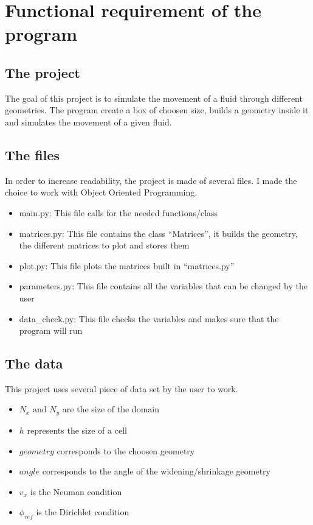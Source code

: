 \section{Functional requirement of the program}
\subsection{The project}
The goal of this project is to simulate the movement of a fluid through
different geometries. The program create a box of choosen size, builds a
geometry inside it and simulates the movement of a given fluid.
\subsection{The files}
In order to increase readability, the project is made of several files.
I made the choice to work with Object Oriented Programming.
\begin{itemize}
    \item main.py: This file calls for the needed functions/class
    \item matrices.py: This file contains the class ``Matrices'', it builds the
          geometry, the different matrices to plot and stores them
    \item plot.py: This file plots the matrices built in ``matrices.py''
    \item parameters.py: This file contains all the variables that can be 
          changed by the user
    \item data\_check.py: This file checks the variables and makes sure that
          the program will run
\end{itemize}
\subsection{The data}
This project uses several piece of data set by the user to work.
\begin{itemize}
    \item $N_x \text{ and } N_y$ are the size of the domain
    \item $h$ represents the size of a cell
    \item $geometry$ corresponds to the choosen geometry
    \item $angle$ corresponds to the angle of the widening/shrinkage geometry
    \item $v_x$ is the Neuman condition
    \item $\phi_{ref}$ is the Dirichlet condition
\end{itemize}

